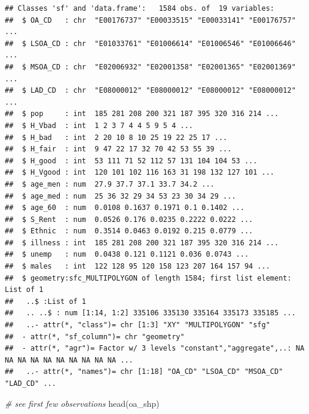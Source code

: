 \documentclass[
]{book}
\newenvironment{Shaded}{\begin{snugshade}}{\end{snugshade}}
\newcommand{\CommentTok}[1]{\textcolor[rgb]{0.56,0.35,0.01}{\textit{#1}}}
\newcommand{\FunctionTok}[1]{\textcolor[rgb]{0.00,0.00,0.00}{#1}}
\newcommand{\NormalTok}[1]{#1}
\begin{document}
\begin{verbatim}
## Classes 'sf' and 'data.frame':   1584 obs. of  19 variables:
##  $ OA_CD   : chr  "E00176737" "E00033515" "E00033141" "E00176757" ...
##  $ LSOA_CD : chr  "E01033761" "E01006614" "E01006546" "E01006646" ...
##  $ MSOA_CD : chr  "E02006932" "E02001358" "E02001365" "E02001369" ...
##  $ LAD_CD  : chr  "E08000012" "E08000012" "E08000012" "E08000012" ...
##  $ pop     : int  185 281 208 200 321 187 395 320 316 214 ...
##  $ H_Vbad  : int  1 2 3 7 4 4 5 9 5 4 ...
##  $ H_bad   : int  2 20 10 8 10 25 19 22 25 17 ...
##  $ H_fair  : int  9 47 22 17 32 70 42 53 55 39 ...
##  $ H_good  : int  53 111 71 52 112 57 131 104 104 53 ...
##  $ H_Vgood : int  120 101 102 116 163 31 198 132 127 101 ...
##  $ age_men : num  27.9 37.7 37.1 33.7 34.2 ...
##  $ age_med : num  25 36 32 29 34 53 23 30 34 29 ...
##  $ age_60  : num  0.0108 0.1637 0.1971 0.1 0.1402 ...
##  $ S_Rent  : num  0.0526 0.176 0.0235 0.2222 0.0222 ...
##  $ Ethnic  : num  0.3514 0.0463 0.0192 0.215 0.0779 ...
##  $ illness : int  185 281 208 200 321 187 395 320 316 214 ...
##  $ unemp   : num  0.0438 0.121 0.1121 0.036 0.0743 ...
##  $ males   : int  122 128 95 120 158 123 207 164 157 94 ...
##  $ geometry:sfc_MULTIPOLYGON of length 1584; first list element: List of 1
##   ..$ :List of 1
##   .. ..$ : num [1:14, 1:2] 335106 335130 335164 335173 335185 ...
##   ..- attr(*, "class")= chr [1:3] "XY" "MULTIPOLYGON" "sfg"
##  - attr(*, "sf_column")= chr "geometry"
##  - attr(*, "agr")= Factor w/ 3 levels "constant","aggregate",..: NA NA NA NA NA NA NA NA NA NA ...
##   ..- attr(*, "names")= chr [1:18] "OA_CD" "LSOA_CD" "MSOA_CD" "LAD_CD" ...
\end{verbatim}

\begin{Shaded}
\begin{Highlighting}[]
\CommentTok{\# see first few observations}
\FunctionTok{head}\NormalTok{(oa\_shp)}
\end{Highlighting}
\end{Shaded}
\end{document}
